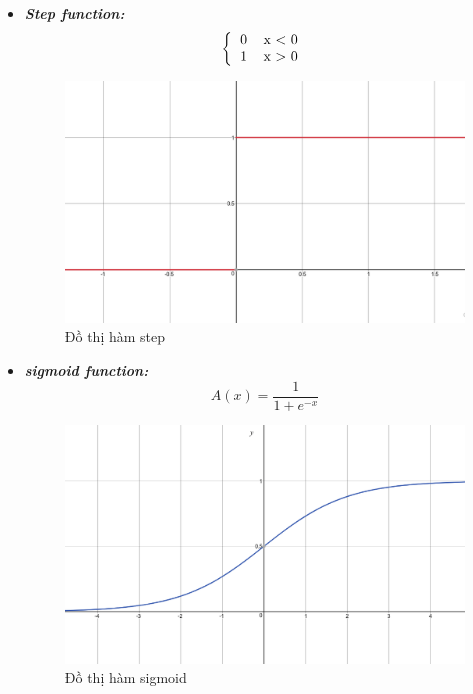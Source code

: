 \begin{itemize}
		\begin{itemize}
			\item \textbf{\textit{Step function: }} 
			\[ 
			\left \{
  			\begin{tabular}{cc}
  				0 & x < 0\\
  				1 &  x > 0 
  			\end{tabular}
		\right.
		\]
		\pagebreak
		\begin{figure}[h!]
			\centering
			\includegraphics[scale=0.2]{charts/step_fun.png}
			\caption{Đồ thị hàm step}
			\label{fig:plot_step}
		\end{figure}
		
			\item \textbf{\textit{sigmoid function: }}
			\[A(x) =  \frac{1}{1 + e^{-x}}	\]
			\begin{figure}[h!]
				\centering
				\includegraphics[scale=0.2]{charts/sigmoid_fun.png}
				\caption{Đồ thị hàm sigmoid}
				\label{fig:plot_sigmoid}
			\end{figure}
			

\end{itemize}
\end{itemize}
